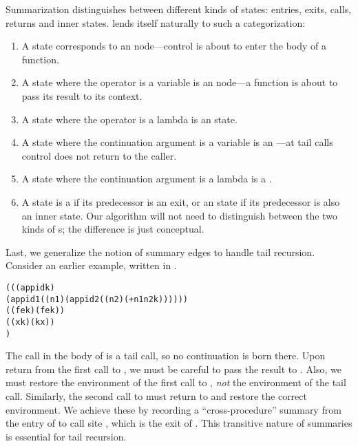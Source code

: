 \documentclass{LMCS}
\theoremstyle{definition} \newtheorem{property}[thm]{Property}
\begin{document}
Summarization distinguishes between different kinds of states: entries, exits, 
calls, returns and inner states.
\cps{} lends itself naturally to such a categorization:
\begin{enumerate}[]
\item
  A \dluapply{} state corresponds to an  node---control is about to 
  enter the body of a function.
\item
  A \dlceval{} state where the operator is a variable is an  
  node---a function is about to pass its result to its context.
\item
  A \dlceval{} state where the operator is a lambda is an  state.
\item
  A \dlueval{} state where the continuation argument is a variable 
  is an ---at tail calls control does not return to the caller.
\item
  A \dlueval{} state where the continuation argument is a lambda is a .
\item
  A \dlcapply{} state is a  if its predecessor is an exit, 
  or an  state if its predecessor is also an inner state.
  Our algorithm will not need to distinguish between the two kinds of
  \dlcapply{}s; the difference is just conceptual.
\end{enumerate}\medskip

\noindent Last, we generalize the notion of summary edges to handle tail recursion.
Consider an earlier example, written in \cps.
\begin{center}
  \begin{minipage}{0.75\columnwidth}
    \begin{alltt}
((\lam(app id k) 
   (app id 1 ((n1) (app id 2 ((n2) (+ n1 n2 k))))))
 (\lam(f e k) (f e k))
 (\lam(x k) (k x))
 \haltcont) \end{alltt}    
  \end{minipage}
\end{center}
The call  in the body of  is a tail call, so no continuation
is born there.
Upon return from the first call to , we must be careful to pass the 
result to .
Also, we must restore the environment of the first call to , \emph{not}
the environment of the tail call.
Sim\-i\-lar\-ly, the second call to  must return to  and restore
the correct environment.
We achieve these by recording a ``cross-procedure'' summary from the entry of 
 to call site , which is the exit of .
This transitive nature of summaries is essential for tail recursion.
\end{document}
